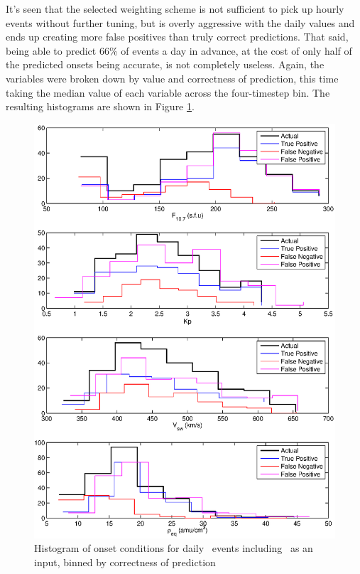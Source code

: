 It's seen that the selected weighting scheme is not sufficient to pick up hourly events without further tuning, but is overly aggressive with the daily values and ends up creating more false positives than truly correct predictions. That said, being able to predict 66\% of events a day in advance, at the cost of only half of the predicted onsets being accurate, is not completely useless. Again, the variables were broken down by value and correctness of prediction, this time taking the median value of each variable across the four-timestep bin. The resulting histograms are shown in Figure \ref{fig:OnsetWithreq-hist-full}.

\begin{figure}[htp!]
	\centering
	\includegraphics[width=1\linewidth]{Figures/CH5/NNBinaryOnset-full-daily-withreq-hist.eps}
	\caption{Histogram of onset conditions for daily \req\ events including \req\ as an input, binned by correctness of prediction}
	\label{fig:OnsetWithreq-hist-full}
\end{figure}

